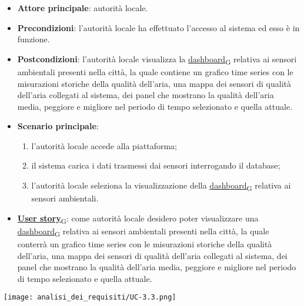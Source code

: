 \newpage
{}
\begin{itemize}
	\item \textbf{Attore principale}: autorità locale.
	\item \textbf{Precondizioni}: l'autorità locale ha effettuato l'accesso al sistema ed esso è in funzione.
	\item \textbf{Postcondizioni}: l'autorità locale visualizza la \href{https://7last.github.io/docs/pb/documentazione-interna/glossario\#dashboard}{dashboard\textsubscript{G}} relativa ai sensori ambientali presenti nella città, la quale contiene un grafico time series con le misurazioni storiche della qualità dell'aria, una mappa dei sensori di qualità dell'aria collegati al sistema, dei panel che mostrano la qualità dell'aria media, peggiore e migliore nel periodo di tempo selezionato e quella attuale.
	\item \textbf{Scenario principale}:
	      \begin{enumerate}
		      \item l'autorità locale accede alla piattaforma;
		      \item il sistema carica i dati trasmessi dai sensori interrogando il database;
		      \item l'autorità locale seleziona la visualizzazione della \href{https://7last.github.io/docs/pb/documentazione-interna/glossario\#dashboard}{dashboard\textsubscript{G}} relativa ai sensori ambientali.
	      \end{enumerate}
	\item \href{https://7last.github.io/docs/pb/documentazione-interna/glossario\#user-story}{\textbf{User story}\textsubscript{G}}:
	      come autorità locale desidero poter visualizzare una \href{https://7last.github.io/docs/pb/documentazione-interna/glossario\#dashboard}{dashboard\textsubscript{G}} relativa ai sensori ambientali presenti nella città, la quale conterrà un grafico time series con le misurazioni storiche della qualità dell'aria, una mappa dei sensori di qualità dell'aria collegati al sistema, dei panel che mostrano la qualità dell'aria media, peggiore e migliore nel periodo di tempo selezionato e quella attuale.
\end{itemize}
\begin{center}
	\texttt{[image: analisi\_dei\_requisiti/UC-3.3.png]}
\end{center}

